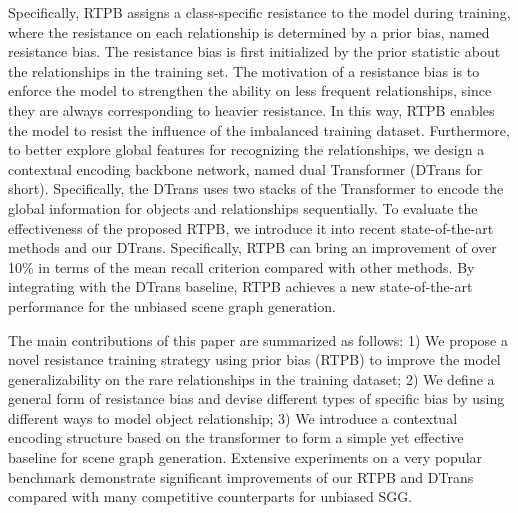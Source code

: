 Specifically, RTPB assigns a class-specific resistance to the model during training, where the resistance on each relationship is determined by a prior bias, named resistance bias. The resistance bias is first initialized by the prior statistic about the relationships in the training set. The motivation of a resistance bias is to enforce the model to strengthen the ability on less frequent relationships, since they are always corresponding to heavier resistance. In this way, RTPB enables the model to resist the influence of the imbalanced training dataset.
Furthermore, to better explore global features for recognizing the relationships, we design a contextual encoding backbone network, named dual Transformer (DTrans for short). Specifically, the DTrans uses two stacks of the Transformer to encode the global information for objects and relationships sequentially. 
To evaluate the effectiveness of the proposed RTPB, we introduce it into recent state-of-the-art methods and our DTrans. Specifically, RTPB can bring an improvement of over 10\% in terms of the mean recall criterion compared with other methods. By integrating with the DTrans baseline, RTPB achieves a new state-of-the-art performance for the unbiased scene graph generation.

The main contributions of this paper are summarized as follows:
1) We propose a novel resistance training strategy using prior bias (RTPB) to improve the model generalizability on  the rare relationships in the training dataset;
2) We define a general form of resistance bias and devise different types of specific bias by using different ways to model object relationship;
3)   We introduce a contextual encoding structure based on the transformer to form a simple yet effective baseline for scene graph generation.
Extensive experiments on a very popular benchmark demonstrate significant improvements of our RTPB and DTrans compared with many competitive counterparts for unbiased SGG.
